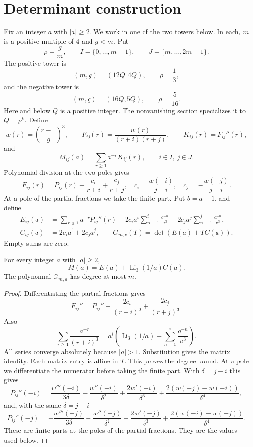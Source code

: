 \section{Determinant construction}\label{sec:determinant}

Fix an integer $a$ with $|a|\ge2$. We work in one of the two towers
below. In each, $m$ is a positive multiple of $4$ and $g<m$. Put
\[
 \rho=\frac gm,\qquad I=\{0,\ldots,m-1\},\qquad
 J=\{m,\ldots,2m-1\}.
\]
The positive tower is
\[
 (m,g)=(12Q,4Q),\qquad \rho=\frac13,
\]
and the negative tower is
\[
 (m,g)=(16Q,5Q),\qquad \rho=\frac5{16}.
\]
Here and below $Q$ is a positive integer. The nonvanishing section
specializes it to $Q=p^k$.
Define
\[
 w(r)=\binom{r-1}{g}^{3},\qquad
 F_{ij}(r)=\frac{w(r)}{(r+i)(r+j)},\qquad K_{ij}(r)=F_{ij}''(r),
\]
and
\[
 M_{ij}(a)=\sum_{r\ge1}a^{-r}K_{ij}(r),\qquad i\in I,\ j\in J.
\]
Polynomial division at the two poles gives
\[
 F_{ij}(r)=P_{ij}(r)+\frac{c_i}{r+i}+\frac{c_j}{r+j},\quad
 c_i=\frac{w(-i)}{j-i},\quad c_j=-\frac{w(-j)}{j-i}.
\]
At a pole of the partial fractions we take the finite part. Put
$b=a-1$, and define
\[
 \begin{aligned}
 E_{ij}(a)&=\sum_{r\ge1}a^{-r}P_{ij}''(r)
 -2c_i a^i\sum_{n=1}^{i}\frac{a^{-n}}{n^3}
 -2c_j a^j\sum_{n=1}^{j}\frac{a^{-n}}{n^3},\\
 C_{ij}(a)&=2c_i a^i+2c_j a^j,\qquad
 G_{m,a}(T)=\det(E(a)+TC(a)).
 \end{aligned}
\]
Empty sums are zero.

\begin{lemma}\label{lem:decomposition}
For every integer $a$ with $|a|\ge2$,
\[
 M(a)=E(a)+\operatorname{Li}_3(1/a)C(a).
\]
The polynomial $G_{m,a}$ has degree at most $m$.
\end{lemma}

\begin{proof}
Differentiating the partial fractions gives
\[
 F_{ij}''=P_{ij}''+\frac{2c_i}{(r+i)^3}
                    +\frac{2c_j}{(r+j)^3}.
\]
Also
\[
 \sum_{r\ge1}\frac{a^{-r}}{(r+i)^3}
 =a^i\left(\operatorname{Li}_3(1/a)
              -\sum_{n=1}^i\frac{a^{-n}}{n^3}\right).
\]
All series converge absolutely because $|a|>1$. Substitution gives the
matrix identity. Each matrix entry is affine in $T$. This proves the
degree bound. At a pole we differentiate the numerator before taking the
finite part. With $\delta=j-i$ this gives
\[
 P_{ij}''(-i)=\frac{w'''(-i)}{3\delta}
 -\frac{w''(-i)}{\delta^2}+\frac{2w'(-i)}{\delta^3}
 +\frac{2(w(-j)-w(-i))}{\delta^4},
\]
 and, with the same $\delta=j-i$,
\[
 P_{ij}''(-j)=-\frac{w'''(-j)}{3\delta}
 -\frac{w''(-j)}{\delta^2}-\frac{2w'(-j)}{\delta^3}
 +\frac{2(w(-i)-w(-j))}{\delta^4}.
\]
These are finite parts at the poles of the partial fractions. They are the
values used below.
\qedhere
\end{proof}

